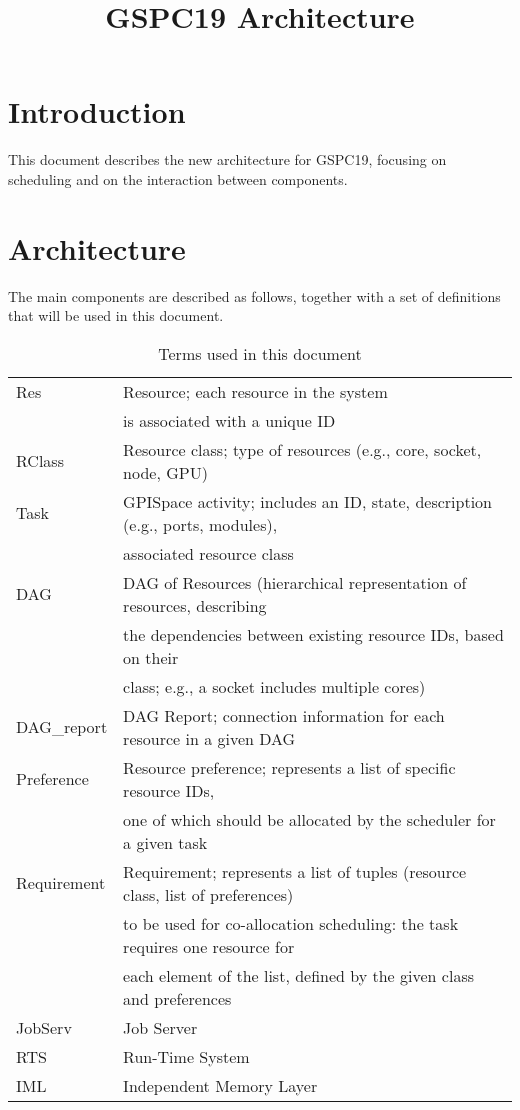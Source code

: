 \documentclass[10pt]{article}
\title{GSPC19 Architecture}
\date{}
\newcommand{\rts}{RTS\xspace}
\newcommand{\iml}{IML\xspace}
\newcommand{\rdag}{DAG\xspace}
\newcommand{\rdagrep}{DAG\_report\xspace}
\newcommand{\js}{JobServ\xspace}
\newcommand{\task}{Task\xspace}
\newcommand{\res}{Res\xspace}
\newcommand{\rc}{RClass\xspace}
\newcommand{\pref}{Preference\xspace}
\newcommand{\req}{Requirement\xspace}
\begin{document}
\maketitle


\section{Introduction}
This document describes the new architecture for GSPC19, focusing on scheduling
and on the interaction between components.


\section{Architecture}
The main components are described as follows, together with a set of definitions that will be used in this document.
%
\begin{table}[ht]
    \centering
    \caption{Terms used in this document}
    \label{tab:rts}
    \bgroup
    \setlength{\tabcolsep}{2em}
    \begin{tabular}{ll}
        \toprule
        \res & Resource; each resource in the system \\ 
                        & is associated with a unique ID \\
        \rc & Resource class; type of resources (e.g., core, socket, node, GPU)\\
        \task & GPISpace activity; includes an ID, state, description (e.g., ports, modules), \\
                        & associated resource class \\
        \rdag & DAG of Resources (hierarchical representation of resources, describing \\
                        & the dependencies between existing resource IDs, based on their \\
                        & class; e.g., a socket includes multiple cores) \\
        \rdagrep &  DAG Report; connection information for each resource in a given DAG \\
        \pref & Resource preference; represents a list of specific resource IDs, \\
                        & one of which should be  allocated by the scheduler for a given task \\
        \req  & Requirement; represents a list of tuples (resource class, list of preferences) \\   
                        & to be used for co-allocation scheduling: the task requires one resource for \\
                        & each element of the list, defined by the given class and preferences  \\ 
        \midrule
        \js & Job Server \\
        \rts & Run-Time System \\
        \iml & Independent Memory Layer \\
        \bottomrule
    \end{tabular}
    \egroup
\end{table}
%
\end{document}
